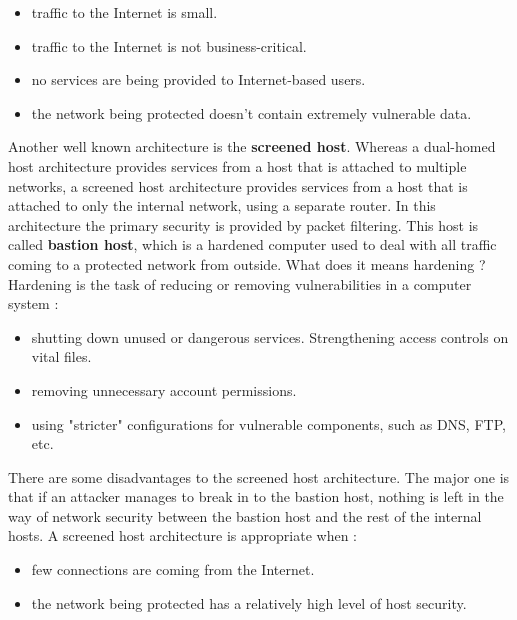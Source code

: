 \documentclass[11pt]{article}
\begin{document}
\begin{itemize}
\item traffic to the Internet is small.
\item traffic to the Internet is not business-critical.
\item no services are being provided to Internet-based users.
\item the network being protected doesn't contain extremely vulnerable data.
\end{itemize}
Another well known architecture is the \textbf{screened host}. Whereas a dual-homed host architecture provides services from a host that is attached to multiple networks, a screened host architecture provides services from a host that is attached to only the internal network, using a separate router. In this architecture the primary security is provided by packet filtering. This host is called \textbf{bastion host}, which is a hardened computer used to deal with all traffic coming to a protected network from outside. What does it means hardening ? Hardening is the task of reducing or removing vulnerabilities in a computer system :
\begin{itemize}
\item shutting down unused or dangerous services. Strengthening access controls on vital files.
\item removing unnecessary account permissions.
\item using "stricter" configurations for vulnerable components, such as DNS, FTP, etc.
\end{itemize}
There are some disadvantages to the screened host architecture. The major one is that if an attacker manages to break in to the bastion host, nothing is left in the way of network security between the bastion host and the rest of the internal hosts. A screened host architecture is appropriate when :
\begin{itemize}
\item few connections are coming from the Internet.
\item the network being protected has a relatively high level of host security.
\end{itemize}
\end{document}

